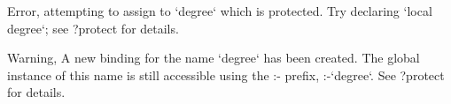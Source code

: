 \documentclass{article}
\begin{document}
\begin{maplegroup}
\begin{mapleinput}
\end{mapleinput}

\mapleresult
\begin{maplelatex}
\end{maplelatex}

\end{maplegroup}
\begin{maplegroup}
\begin{mapleinput}
\end{mapleinput}

\mapleresult
\begin{maplettyout}
Error, attempting to assign to `degree` which is protected.  Try
declaring `local degree`; see ?protect for details.
\end{maplettyout}

\end{maplegroup}
\begin{maplegroup}
\begin{mapleinput}
\end{mapleinput}

\mapleresult
\begin{maplelatex}
\end{maplelatex}

\end{maplegroup}
\begin{maplegroup}
\begin{mapleinput}
\end{mapleinput}

\mapleresult
\begin{maplelatex}
\end{maplelatex}

\end{maplegroup}
\begin{maplegroup}
\begin{mapleinput}
\end{mapleinput}

\mapleresult
\begin{maplettyout}
Warning, A new binding for the name `degree` has been created. The
global instance of this name is still accessible using the :- prefix,
:-`degree`.  See ?protect for details.
\end{maplettyout}

\end{maplegroup}
\end{document}
